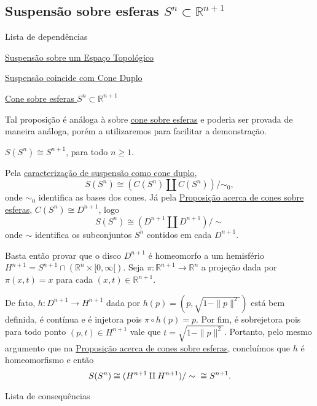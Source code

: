 \subsection{Suspensão sobre esferas $S^n\subset\mathbb{R}^{n+1}$}
\label{suspensao-esfera-prop}
\begin{titlemize}{Lista de dependências}
	\item \hyperref[suspensao-def]{Suspensão sobre um Espaço Topológico}
    \item \hyperref[suspensao-cone-duplo-prop]{Suspensão coincide com Cone Duplo}
    \item \hyperref[cone-esfera-prop]{Cone sobre esferas $S^n\subset\mathbb{R}^{n+1}$}
\end{titlemize}


Tal proposição é análoga à sobre \hyperref[cone-esfera-prop]{cone sobre esferas} e poderia ser provada de maneira análoga, porém a utilizaremos para facilitar a demonstração.

\begin{prop}
	$S(S^n) \cong S^{n+1}$, para todo $n\geq 1$.

    \begin{dem}
        Pela \hyperref[suspensao-cone-duplo-prop]{caracterização de suspensão como cone duplo}, \[S(S^n) \cong (C(S^n) \amalg C(S^n))/\sim_0,\] onde $\sim_0$ identifica as bases dos cones. Já pela \hyperref[cone-esfera-prop]{Proposição acerca de cones sobre esferas}, $C(S^n) \cong D^{n+1}$, logo \[S(S^n) \cong (D^{n+1} \amalg D^{n+1})/\sim\] onde $\sim$ identifica os subconjuntos $S^n$ contidos em cada $D^{n+1}$.
        
        Basta então provar que o disco $D^{n+1}$ é homeomorfo a um hemisfério $H^{n+1} = S^{n+1}\cap (\mathbb{R}^n \times [0,\infty[)$. Seja $\pi:\mathbb{R}^{n+1}\to\mathbb{R}^n$ a projeção dada por $\pi(x,t) = x$ para cada $(x,t) \in \mathbb{R}^{n+1}$.
        
        De fato, $h:D^{n+1}\to H^{n+1}$ dada por $h(p)=(p,\sqrt{1-\|p\|^2})$ está bem definida, é contínua e é injetora pois $\pi \circ h(p) = p$. Por fim, é sobrejetora pois para todo ponto $(p,t)\in H^{n+1}$ vale que $t=\sqrt{1-\|p\|^2}$. Portanto, pelo mesmo argumento que na \hyperref[cone-esfera-prop]{Proposição acerca de cones sobre esferas}, concluímos que $h$ é homeomorfismo e então\[S(S^n) \cong (H^{n+1} \amalg H^{n+1})/\sim \hspace{6 pt} \cong S^{n+1}.\]
    \end{dem}
\end{prop}

\begin{titlemize}{Lista de consequências}
\end{titlemize}